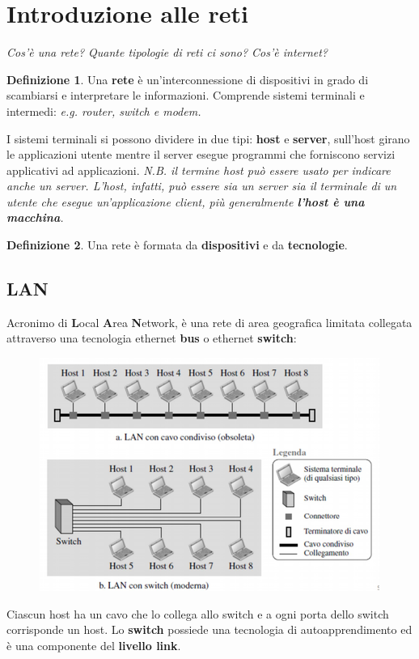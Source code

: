 \documentclass[11pt,a4paper]{article}
\theoremstyle{definition}
\newtheorem{definition}{Definizione}[section]
\begin{document}
\section{Introduzione alle reti}
\textit{Cos'è una rete? Quante tipologie di reti ci sono? Cos'è internet?}

\theoremstyle{definition}
\begin{definition}
	Una \textbf{rete} è un'interconnessione di dispositivi in grado di scambiarsi e interpretare le informazioni. Comprende sistemi terminali e intermedi: \textit{e.g. router, switch e modem.}
\end{definition}
I sistemi terminali si possono dividere in due tipi: \textbf{host} e \textbf{server}, sull'host girano le applicazioni utente mentre il server esegue programmi che forniscono servizi applicativi ad applicazioni. \newline \textit{N.B. il termine host può essere usato per indicare anche un server. \newline L'host, infatti, può essere sia un server sia il terminale di un utente che esegue un'applicazione client, più generalmente \textbf{l'host è una macchina}.}

\theoremstyle{definition}
\begin{definition}
	Una rete è formata da \textbf{dispositivi} e da \textbf{tecnologie}.
\end{definition}

\subsection{LAN}
Acronimo di \textbf{L}ocal \textbf{A}rea \textbf{N}etwork, è
una rete di area geografica limitata collegata attraverso una tecnologia ethernet \textbf{bus} o ethernet \textbf{switch}:
\begin{figure}[!h]
	\includegraphics[scale=0.85]{Immagini/LAN.png}
	\centering
\end{figure}
Ciascun host ha un cavo che lo collega allo switch e a ogni porta dello switch corrisponde un host. Lo \textbf{switch} possiede una tecnologia di autoapprendimento ed è una componente del \textbf{livello link}.
\newpage
\end{document}

